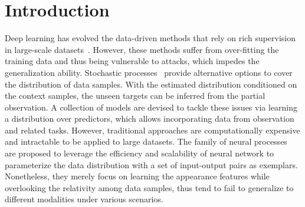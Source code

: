 \documentclass[sigconf]{acmart} %
\begin{document}
\section{Introduction}

Deep learning has evolved the data-driven methods that rely on rich supervision in large-scale datasets~\cite{krizhevsky2012imagenet,lin2014coco,kriz2009cifar}. However, these methods suffer from over-fitting the training data and thus being vulnerable to attacks, which impedes the generalization ability. Stochastic processes~\cite{insua2012bayesian,lei2016new,ye2015stochastic,10.2307/1911358} provide alternative options to cover the distribution of data samples. 
With the estimated distribution conditioned on the context samples, the unseen targets can be inferred from the partial observation. A collection of models are devised to tackle these issues via learning a distribution over predictors, which allows incorporating data from observation and related tasks. 
However, traditional approaches are computationally expensive and intractable to be applied to large datasets. 
The family of neural processes~\cite{garnelo2018conditional,garnelo2018neural,kim2019attentive} are proposed to leverage the efficiency and scalability of neural network to parameterize the data distribution with a set of input-output pairs as exemplars. 
Nonetheless, they merely focus on learning the appearance features while overlooking the relativity among data samples, thus tend to fail to generalize to different modalities under various scenarios.
\end{document}
